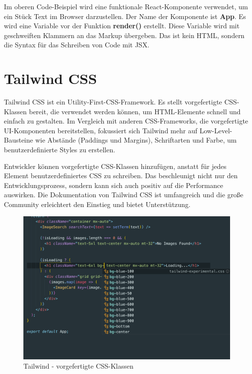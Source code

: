 Im oberen Code-Beispiel wird eine funktionale React-Komponente verwendet, um ein Stück Text im Browser darzustellen. 
Der Name der Komponente ist \textbf{App}. Es wird eine Variable vor der Funktion \textbf{render()} erstellt.
Diese Variable wird mit geschweiften Klammern an das Markup übergeben. Das ist kein HTML, sondern die 
Syntax für das Schreiben von Code mit JSX.

\clearpage

\section{Tailwind CSS}
Tailwind CSS ist ein Utility-First-CSS-Framework. Es stellt vorgefertigte CSS-Klassen bereit, die verwendet 
werden können, um HTML-Elemente schnell und einfach zu gestalten. Im Vergleich mit anderen CSS-Frameworks, 
die vorgefertigte UI-Komponenten bereitstellen, fokussiert sich Tailwind mehr auf Low-Level-Bausteine wie 
Abstände (Paddings und Margins), Schriftarten und Farbe, um benutzerdefinierte Styles zu erstellen.

Entwickler können vorgefertigte CSS-Klassen hinzufügen, anstatt für jedes Element benutzerdefiniertes CSS zu 
schreiben. Das beschleunigt nicht nur den Entwicklungsprozess, sondern kann sich auch positiv auf die Performance 
auswirken. Die Dokumentation von Tailwind CSS ist umfangreich und die große Community erleichtert den Einstieg und 
bietet Unterstützung.

\begin{figure}[ht!]
    \includegraphics[width=.94\textwidth]{pics/tailwindCSS-class-showcase.png}
    \caption{\label{fig:The-caption}Tailwind - vorgefertigte CSS-Klassen \cite{APCW2006}}
  \end{figure}


